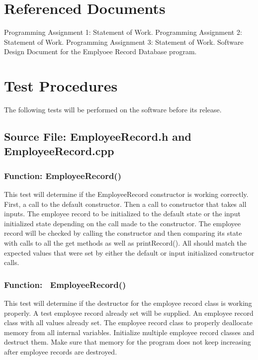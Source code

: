 \documentclass[12pt]{article}%
\newcounter{subsubsubsection}[subsubsection]
\begin{document}
\section{Referenced Documents}
Programming Assignment 1: Statement of Work.
Programming Assignment 2: Statement of Work.
Programming Assignment 3: Statement of Work.
Software Design Document for the Emplyoee Record Database program.

\section{Test Procedures}
The following tests will be performed on the software before its release.
\subsection{Source File: EmployeeRecord.h and EmployeeRecord.cpp}
\subsubsection{Function: EmployeeRecord()}
This test will determine if the EmployeeRecord constructor is working correctly.
First, a call to the default constructor. Then a call to constructor that takes all inputs.
The employee record to be initialized to the default state or the input initialized state
depending on the call made to the constructor.
The employee record will be checked by calling the constructor and then comparing its state with
calls to all the get methods as well as printRecord(). All should match the expected values that
were set by either the default or input initialized constructor calls.

\subsubsection{Function: ~EmployeeRecord()}
This test will determine if the destructor for the employee record class is working properly. A test
employee record already set will be supplied.
An employee record class with all values already set.
The employee record class to properly deallocate memory from all internal variables.
Initialize multiple employee record classes and destruct them. Make sure that memory for the program does
not keep increasing after employee records are destroyed.
\end{document}
